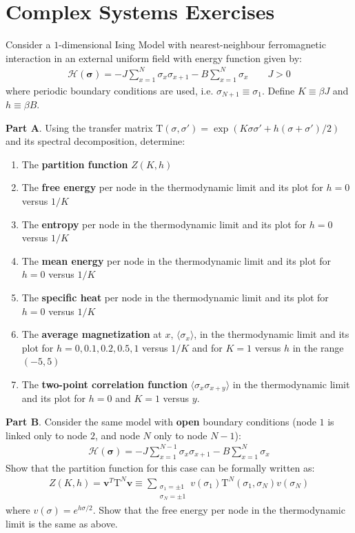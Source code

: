 \documentclass[12pt,a4paper]{report}
\begin{document}
\chapter{Complex Systems Exercises}


\begin{exo}
    Consider a $1$-dimensional Ising Model with nearest-neighbour ferromagnetic interaction in an external uniform field with energy function given by:
    \begin{align*}
        \mathcal{H}(\bm{\sigma}) = -J \sum_{x=1}^N \sigma_x \sigma_{x+1} - B \sum_{x=1}^N \sigma_x \qquad J > 0
    \end{align*}    
    where periodic boundary conditions are used, i.e. $\sigma_{N+1} \equiv \sigma_1$. Define $K \equiv \beta J$ and $h \equiv \beta B$.
    
    \medskip
    
    \textbf{Part A}. Using the transfer matrix $\mathrm{T}(\sigma, \sigma') = \exp(K \sigma \sigma' + h (\sigma + \sigma')/2)$ and its spectral decomposition, determine:
    \begin{enumerate}
        \item The \textbf{partition function} $Z(K,h)$
        \item The \textbf{free energy} per node in the thermodynamic limit and its plot for $h=0$ versus $1/K$
        \item The \textbf{entropy} per node in the thermodynamic limit and its plot for $h=0$ versus $1/K$
        \item The \textbf{mean energy} per node in the thermodynamic limit and its plot for $h=0$ versus $1/K$
        \item The \textbf{specific heat} per node in the thermodynamic limit and its plot for $h=0$ versus $1/K$
        \item The \textbf{average magnetization} at $x$, $\langle \sigma_x \rangle$, in the thermodynamic limit and its plot for $h=0, 0.1, 0.2, 0.5, 1$ versus $1/K$ and for $K=1$ versus $h$ in the range $(-5,5)$
        \item The \textbf{two-point correlation function} $\langle \sigma_x \sigma_{x+y} \rangle$ in the thermodynamic limit and its plot for $h=0$ and $K=1$ versus $y$.
    \end{enumerate}

    \textbf{Part B}. Consider the same model with \textbf{open} boundary conditions (node $1$ is linked only to node $2$, and node $N$ only to node $N-1$):
    \begin{align*}
        \mathcal{H}(\bm{\sigma}) = -J \sum_{x=1}^{N-1} \sigma_x \sigma_{x+1} - B \sum_{x=1}^N \sigma_x
    \end{align*}   
    Show that the partition function for this case can be formally written as:
    \begin{align*}
        Z(K,h) = \bm{v}^T \mathrm{T}^N \bm{v} \equiv \sum_{\substack{\sigma_1 = \pm 1\\ \sigma_N = \pm 1}} v(\sigma_1) \mathrm{T}^N(\sigma_1, \sigma_N) v(\sigma_N)  
    \end{align*}
    where $v(\sigma) = e^{h \sigma /2}$. Show that the free energy per node in the thermodynamic limit is the same as above.
    

\end{exo}
\end{document}
